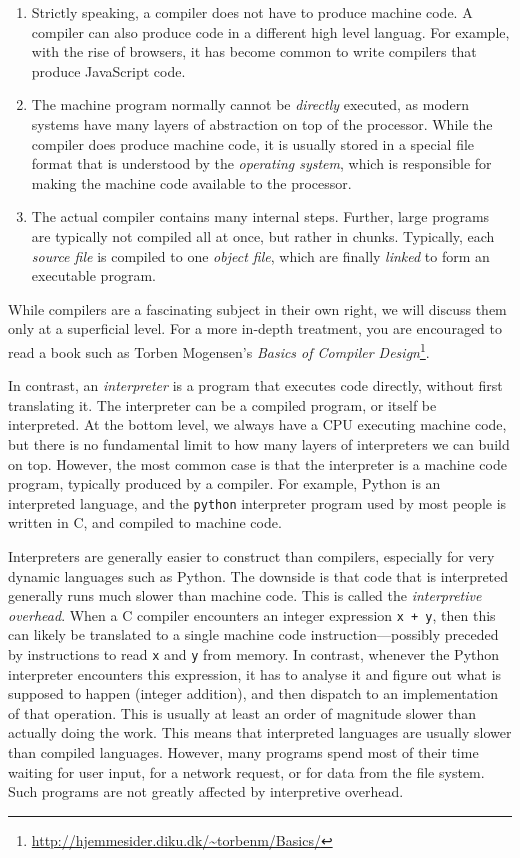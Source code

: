 \begin{enumerate}
\item Strictly speaking, a compiler does not have to produce machine
  code.  A compiler can also produce code in a different high level
  languag.  For example, with the rise of browsers, it has become
  common to write compilers that produce JavaScript code.
\item The machine program normally cannot be \textit{directly}
  executed, as modern systems have many layers of abstraction on top
  of the processor.  While the compiler does produce machine code, it
  is usually stored in a special file format that is understood by the
  \textit{operating system}, which is responsible for making the
  machine code available to the processor.
\item The actual compiler contains many internal steps.  Further,
  large programs are typically not compiled all at once, but rather in
  chunks.  Typically, each \textit{source file} is compiled to one
  \textit{object file}, which are finally \textit{linked} to form an
  executable program.
\end{enumerate}

While compilers are a fascinating subject in their own right, we will
discuss them only at a superficial level.  For a more in-depth
treatment, you are encouraged to read a book such as Torben Mogensen's
\textit{Basics of Compiler
  Design}\footnote{\url{http://hjemmesider.diku.dk/~torbenm/Basics/}}.

In contrast, an \textit{interpreter} is a program that executes code
directly, without first translating it.  The interpreter can be a
compiled program, or itself be interpreted.  At the bottom level, we
always have a CPU executing machine code, but there is no fundamental
limit to how many layers of interpreters we can build on top.
However, the most common case is that the interpreter is a machine
code program, typically produced by a compiler.  For example, Python
is an interpreted language, and the \texttt{python} interpreter
program used by most people is written in C, and compiled to machine
code.

Interpreters are generally easier to construct than compilers,
especially for very dynamic languages such as Python.  The downside is
that code that is interpreted generally runs much slower than machine
code.  This is called the \textit{interpretive overhead}.  When a C
compiler encounters an integer expression \texttt{x + y}, then this
can likely be translated to a single machine code
instruction---possibly preceded by instructions to read \texttt{x} and
\texttt{y} from memory.  In contrast, whenever the Python interpreter
encounters this expression, it has to analyse it and figure out what
is supposed to happen (integer addition), and then dispatch to an
implementation of that operation.  This is usually at least an order
of magnitude slower than actually doing the work.  This means that
interpreted languages are usually slower than compiled languages.
However, many programs spend most of their time waiting for user
input, for a network request, or for data from the file system.  Such
programs are not greatly affected by interpretive overhead.

